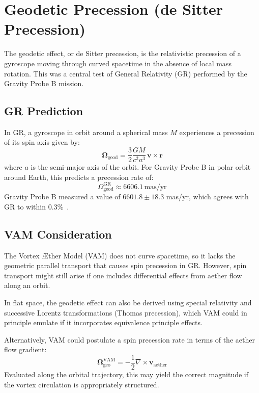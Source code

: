 \section{Geodetic Precession (de Sitter Precession)}

The geodetic effect, or de Sitter precession, is the relativistic precession of a gyroscope moving through curved spacetime in the absence of local mass rotation. This was a central test of General Relativity (GR) performed by the Gravity Probe B mission.

\subsection*{GR Prediction}

In GR, a gyroscope in orbit around a spherical mass $M$ experiences a precession of its spin axis given by:
\begin{equation}
    \boldsymbol{\Omega}_{\text{geod}} = \frac{3}{2} \frac{GM}{c^2 a^3} \, \mathbf{v} \times \mathbf{r}
\end{equation}
where $a$ is the semi-major axis of the orbit. For Gravity Probe B in polar orbit around Earth, this predicts a precession rate of:
\begin{equation}
    \Omega_{\text{geod}}^{\text{GR}} \approx 6606.1 \, \text{mas/yr}
\end{equation}
Gravity Probe B measured a value of $6601.8 \pm 18.3$ mas/yr, which agrees with GR to within $0.3\%$~\cite{everitt2011}.

\subsection*{VAM Consideration}

The Vortex Æther Model (VAM) does not curve spacetime, so it lacks the geometric parallel transport that causes spin precession in GR. However, spin transport might still arise if one includes differential effects from aether flow along an orbit.

In flat space, the geodetic effect can also be derived using special relativity and successive Lorentz transformations (Thomas precession), which VAM could in principle emulate if it incorporates equivalence principle effects.

Alternatively, VAM could postulate a spin precession rate in terms of the aether flow gradient:
\begin{equation}
    \boldsymbol{\Omega}_{\text{geo}}^{\text{VAM}} = -\frac{1}{2} \nabla \times \mathbf{v}_{\text{aether}}
\end{equation}
Evaluated along the orbital trajectory, this may yield the correct magnitude if the vortex circulation is appropriately structured.

